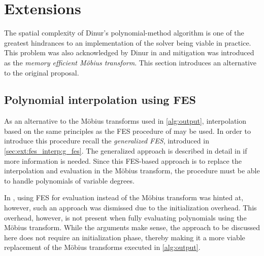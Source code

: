 \section{Extensions} \label{sec:ext}
The spatial complexity of Dinur's polynomial-method algorithm is one of the greatest hindrances to an implementation of the solver being viable in practice. This problem was also acknowledged by Dinur in \cite{eurocrypt-2021-30841} and mitigation was introduced as the \textit{memory efficient Möbius transform}. This section introduces an alternative to the original proposal.
 
\subsection{Polynomial interpolation using FES} \label{sec:ext:fes_interp}
As an alternative to the Möbius transforms used in \cref{alg:output}, interpolation based on the same principles as the FES procedure of \cite{ches-2010-23990} may be used. In order to introduce this procedure recall the \textit{generalized FES}, introduced in \cref{sec:ext:fes_interp:g_fes}. The generalized approach is described in detail in \cite{tungchoumasters} if more information is needed. Since this FES-based approach is to replace the interpolation and evaluation in the Möbius transform, the procedure must be able to handle polynomials of variable degrees.

In \cite{eurocrypt-2021-30841}, using FES for evaluation instead of the Möbius transform was hinted at, however, such an approach was dismissed due to the initialization overhead. This overhead, however, is not present when fully evaluating polynomials using the Möbius transform. While the arguments make sense, the approach to be discussed here does not require an initialization phase, thereby making it a more viable replacement of the Möbius transforms executed in \cref{alg:output}.


